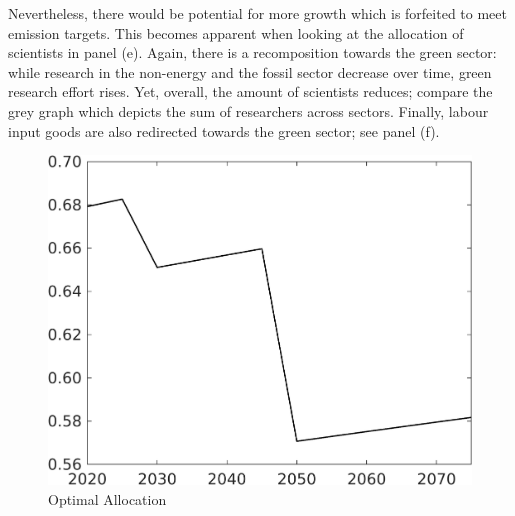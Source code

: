 Nevertheless, there would be potential for more growth which is forfeited to meet emission targets. This becomes apparent when looking at the allocation of scientists in panel (e). Again, there is a recomposition towards the green sector: while research in the non-energy and the fossil sector decrease over time, green research effort rises. Yet, overall, the amount of scientists reduces; compare the grey graph which depicts the sum of researchers across sectors. 
Finally, labour input goods are also redirected towards the green sector; see panel (f). 

\begin{figure}[h!!]
	\centering
	\caption{Optimal Allocation }\label{fig:optAll}
	
	
	\begin{minipage}[]{0.32\textwidth}
		\includegraphics[width=1\textwidth]{../../codding_model/own_basedOnFried/optimalPol_elastS_DisuSci/figures/all_1705/Single_OPT_T_NoTaus_C_spillover0_sep1_BN0_ineq0_red0_etaa0.79.png}
	\end{minipage}
	\begin{minipage}[]{0.32\textwidth}

\end{minipage}
\end{figure}
